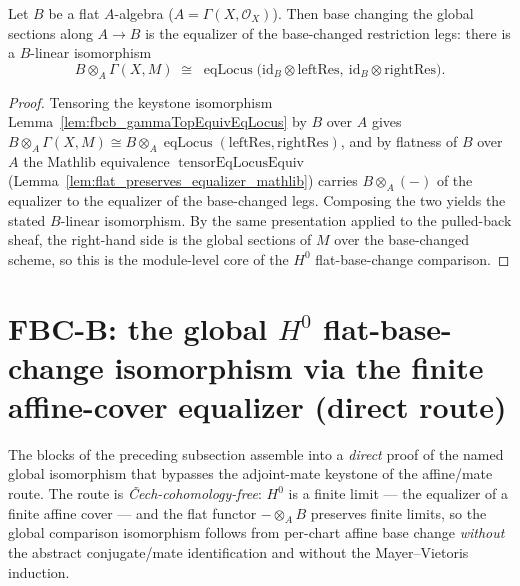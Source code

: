 \begin{lemma}
  \label{lem:fbcb_baseChangeGammaEquiv}
  Let \(B\) be a flat \(A\)-algebra (\(A = \Gamma(X,\mathcal{O}_X)\)). Then base changing the global
  sections along \(A \to B\) is the equalizer of the base-changed restriction legs: there is a
  \(B\)-linear isomorphism
  \[
    B \otimes_A \Gamma(X, M) \;\cong\;
      \operatorname{eqLocus}\bigl(\mathrm{id}_B \otimes \mathrm{leftRes},\ \mathrm{id}_B \otimes \mathrm{rightRes}\bigr).
  \]
  \begin{proof}
    Tensoring the keystone isomorphism Lemma~\ref{lem:fbcb_gammaTopEquivEqLocus} by \(B\) over \(A\)
    gives \(B \otimes_A \Gamma(X,M) \cong B \otimes_A \operatorname{eqLocus}(\mathrm{leftRes},\mathrm{rightRes})\),
    and by flatness of \(B\) over \(A\) the Mathlib equivalence \(\operatorname{tensorEqLocusEquiv}\)
    (Lemma~\ref{lem:flat_preserves_equalizer_mathlib}) carries \(B \otimes_A (-)\) of the equalizer to the
    equalizer of the base-changed legs. Composing the two yields the stated \(B\)-linear isomorphism.
    By the same presentation applied to the pulled-back sheaf, the right-hand side is the global sections
    of \(M\) over the base-changed scheme, so this is the module-level core of the \(H^0\)
    flat-base-change comparison.
  \end{proof}
\end{lemma}

\section{FBC-B: the global \texorpdfstring{$H^0$}{H0} flat-base-change isomorphism via the finite affine-cover equalizer (direct route)}

The blocks of the preceding subsection assemble into a \emph{direct} proof of the named global
isomorphism that bypasses the adjoint-mate keystone of the affine/mate route. The route is
\emph{{\v C}ech-cohomology-free}: \(H^0\) is a finite limit — the equalizer of a finite affine cover —
and the flat functor \(-\otimes_A B\) preserves finite limits, so the global comparison isomorphism
follows from per-chart affine base change \emph{without} the abstract conjugate/mate identification and
without the Mayer--Vietoris induction.

